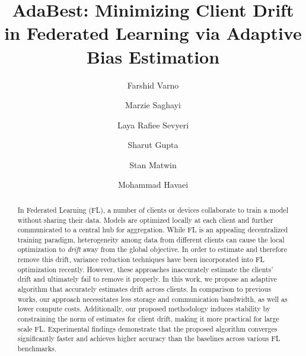 \documentclass[runningheads]{llncs}
\begin{document}
\pagestyle{headings}
\mainmatter

\title{AdaBest: Minimizing Client Drift in Federated Learning via Adaptive Bias Estimation} 

\author{Farshid Varno
\and
Marzie Saghayi
\and
Laya Rafiee Sevyeri
\and
Sharut Gupta
\and
Stan Matwin
\and
Mohammad Havaei
}
\maketitle

\begin{abstract}

In Federated Learning (FL), a number of clients or devices collaborate to train a model without sharing their data. Models are optimized locally at each client and further communicated to a central hub for aggregation. While FL is an appealing decentralized training paradigm, heterogeneity among data from different clients can cause the local optimization to {\it drift} away from the global objective. 
In order to estimate and therefore remove this drift, variance reduction techniques have been incorporated into FL optimization recently. However, these approaches inaccurately estimate the clients' drift and ultimately fail to remove it properly. 
In this work, we propose an adaptive algorithm that accurately estimates drift across clients. 
In comparison to previous works, our approach necessitates less storage and communication bandwidth, as well as lower compute costs. Additionally, our proposed methodology induces stability by constraining the norm of estimates for client drift, making it more practical for large scale FL. Experimental findings demonstrate that the proposed algorithm converges significantly faster and achieves higher accuracy than the baselines across various FL benchmarks.



\end{abstract}
\end{document}
